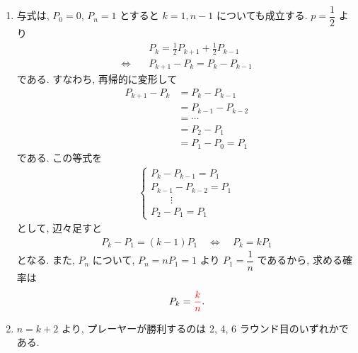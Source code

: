 \begin{qenumerate}
{\begin{enumerate}
{				すなわち
				\begin{align}
					P_{1} = pP_{2}
				\end{align}
				である.
				以上より
				\begin{align}
					P_{2} &= p[p + (1 - p)P_{2}] + (1 - p)pP_{2} \\
						&= \left(2p - 2p^{2}\right)P_{2} + p^{2}
				\end{align}
				すなわち
				\begin{align}
					P_{2} = \red{\frac{p^{2}}{1 - 2p + 2p^{2}}}.
				\end{align}
			}
			\item{
				与式は, $P_{0} = 0$, $P_{n} = 1$ とすると $k = 1, n - 1$ についても成立する.
				$p = \dfrac{1}{2}$ より
				\begin{align}
					& P_{k} = \frac{1}{2}P_{k + 1} + \frac{1}{2}P_{k - 1} \\
					\Leftrightarrow\quad & P_{k + 1} - P_{k} = P_{k} - P_{k - 1}
				\end{align}
				である.
				すなわち, 再帰的に変形して
				\begin{align}
					P_{k + 1} - P_{k} &= P_{k} - P_{k - 1} \\
						&= P_{k - 1} - P_{k - 2} \\
						&= \cdots \\
						&= P_{2} - P_{1} \\
						&= P_{1} - P_{0} = P_{1}
				\end{align}
				である.
				この等式を
				\begin{align}
					\begin{cases}
						P_{k} - P_{k - 1} = P_{1} \\
						P_{k - 1} - P_{k - 2} = P_{1} \\
						\quad\quad\vdots \\
						P_{2} - P_{1} = P_{1}
					\end{cases}
				\end{align}
				として, 辺々足すと
				\begin{align}
					P_{k} - P_{1} = (k - 1)P_{1} \quad\Leftrightarrow\quad P_{k} = kP_{1}
				\end{align}
				となる.
				また, $P_{n}$ について, $P_{n} = nP_{1} = 1$ より $P_{1} = \dfrac{1}{n}$ であるから, 求める確率は
				\begin{align}
					P_{k} = \textcolor{red}{\frac{k}{n}}.
				\end{align}
			}
			\item{
				$n =  k + 2$ より, プレーヤーが勝利するのは 2, 4, 6 ラウンド目のいずれかである.
}
\end{enumerate}}
\end{qenumerate}

